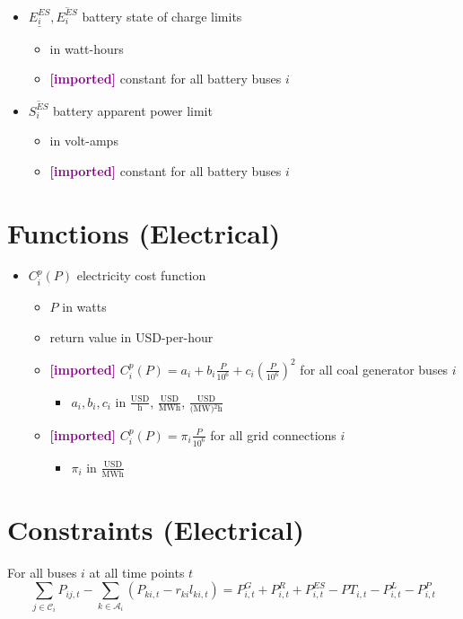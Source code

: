 \documentclass{article}
\newcommand{\lo}[1]{\underline{#1}}
\newcommand{\hi}[1]{\overline{#1}}
\newcommand{\imported}{\textcolor{purple}{\textbf{[imported] }}}
\def\sC{\mathcal C}
\def\sA{\mathcal A}
\begin{document}
\begin{itemize}
\item $\lo{E^{ES}_i}, \hi{E^{ES}_i}$ battery state of charge limits
  \begin{itemize}
  \item in watt-hours
  \item \imported constant for all battery buses $i$
  \end{itemize}

\item $\hi{S^{ES}_i}$ battery apparent power limit
  \begin{itemize}
  \item in volt-amps
  \item \imported constant for all battery buses $i$
  \end{itemize}

\end{itemize}


\section{Functions (Electrical)}
\begin{itemize}
\item $C^p_i(P)$ electricity cost function
  \begin{itemize}
  \item $P$ in watts
  \item return value in USD-per-hour

  \item \imported
    $C^p_i(P) = a_i + b_i\frac{P}{10^6} + c_i\left(\frac{P}{10^6}\right)^2$
    for all coal generator buses $i$
    \begin{itemize}
    \item $a_i, b_i, c_i$ in $\frac{\text{USD}}{\text{h}}$,
      $\frac{\text{USD}}{\text{MWh}}$, $\frac{\text{USD}}{\text{(MW)$^2$h}}$
    \end{itemize}

  \item \imported $C^p_i(P) = \pi_i\frac{P}{10^6}$ for all grid connections $i$
    \begin{itemize}
    \item $\pi_i$ in $\frac{\text{USD}}{\text{MWh}}$
    \end{itemize}
  \end{itemize}
\end{itemize}



\section{Constraints (Electrical)}
For all buses $i$ at all time points $t$
\begin{equation}
  \sum_{j \in \sC_i} P_{ij,t} - \sum_{k \in \sA_i} (P_{ki,t} - r_{ki} l_{ki,t}) =
  P^G_{i,t} + P^R_{i,t} + P^{ES}_{i,t} - PT_{i,t} - P^L_{i,t} - P^P_{i,t}
\end{equation}
\end{document}
